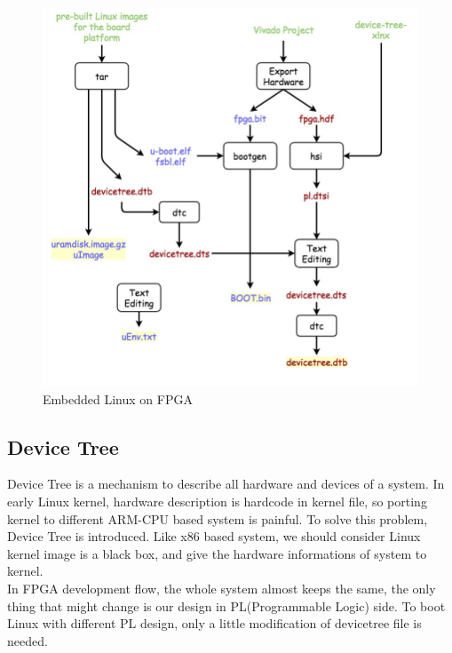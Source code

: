 \begin{figure}[!htb]
  \centering
  \includegraphics[scale=0.5]{images/embedded_linux.jpg}
  \caption[Embedded Linux on FPGA]{Embedded Linux on FPGA}
  \label{fig:Embedded Linux on FPGA}
\end{figure}



\subsection{Device Tree}
\label{subsec:Device Tree}

Device Tree is a mechanism to describe all hardware and devices of a system. In early Linux 
kernel, hardware description is hardcode in kernel file, so porting kernel to different
ARM-CPU based system is painful. To solve this problem, Device Tree is introduced. 
Like x86 based system, we should consider Linux kernel image is a black box, and give the 
hardware informations of system to kernel. \\
%
In FPGA development flow, the whole system almost keeps the same, the only thing that might change 
is our design in PL(Programmable Logic) side. To boot Linux with different PL design, only 
a little modification of devicetree file is needed.     


